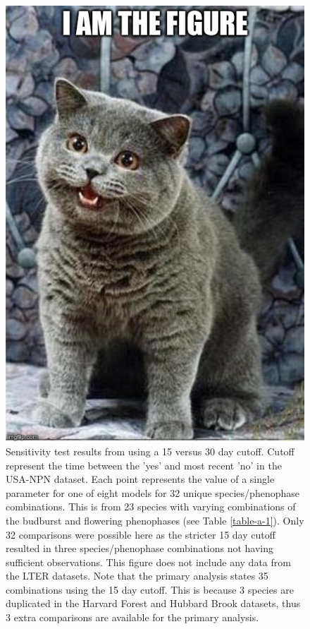 \begin{figure}
	\centering
	\includegraphics[scale=0.5]{images/figure_filler.jpg}
	\caption[Sensitivity test results from using a 15 versus 30 day cutoff]{Sensitivity test results from using a 15 versus 30 day cutoff. Cutoff represent the time between the 'yes' and most recent 'no' in the USA-NPN dataset. Each point represents the value of a single parameter for one of eight models for 32 unique species/phenophase combinations. This is from 23 species with varying combinations of the budburst and flowering phenophases (see Table \ref{table-a-1}). Only 32 comparisons were possible here as the stricter 15 day cutoff resulted in three species/phenophase combinations not having sufficient observations. This figure does not include any data from the LTER datasets. Note that the primary analysis states 35 combinations using the 15 day cutoff. This is because 3 species are duplicated in the Harvard Forest and Hubbard Brook datasets, thus 3 extra comparisons are available for the primary analysis.} \label{fig-a-1}
\end{figure}


